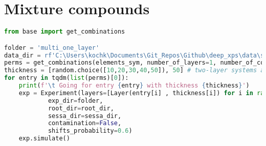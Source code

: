 \hypertarget{mixture-compounds}{%
\section*{Mixture compounds}\label{mixture-compounds}}

\begin{lstlisting}[language=Python]
from base import get_combinations

folder = 'multi_one_layer'
data_dir = rf'C:\Users\kochk\Documents\Git_Repos\Github\deep_xps\data\simulation_data\{folder}'
perms = get_combinations(elements_sym, number_of_layers=1, number_of_combinations=30_000, lower=2, upper=4) # get one layer
thickness = [random.choice([10,20,30,40,50]), 50] # two-layer systems always have second layer of 50 Angstrom
for entry in tqdm(list(perms)[0]):
    print(f'\t Going for entry {entry} with thickness {thickness}')
    exp = Experiment(layers=[Layer(entry[i] , thickness[i]) for i in range(len(entry))],
            exp_dir=folder,
            root_dir=root_dir,
            sessa_dir=sessa_dir,
            contamination=False,
            shifts_probability=0.6)
    exp.simulate()
\end{lstlisting}
